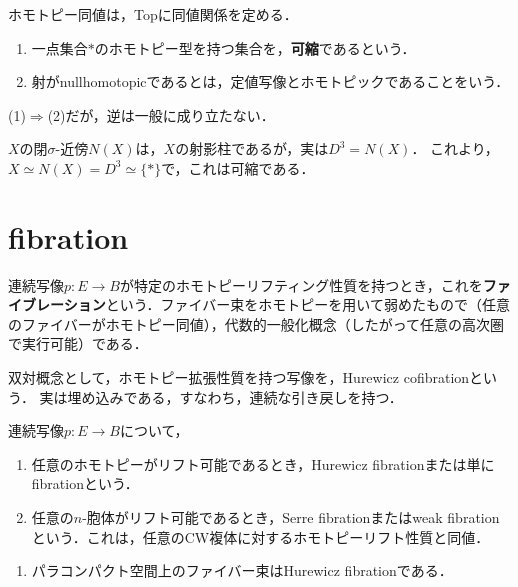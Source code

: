 \documentclass[uplatex,dvipdfmx]{jsreport}
\begin{document}
\begin{lemma}
    ホモトピー同値は，Topに同値関係を定める．
\end{lemma}

\begin{definition}\mbox{}
    \begin{enumerate}
        \item 一点集合$*$のホモトピー型を持つ集合を，\textbf{可縮}であるという．
        \item 射がnullhomotopicであるとは，定値写像とホモトピックであることをいう．
    \end{enumerate}
    (1)$\Rightarrow$(2)だが，逆は一般に成り立たない．
\end{definition}

\begin{example}
    $X$の閉$\sigma$-近傍$N(X)$は，$X$の射影柱であるが，実は$D^3= N(X)$．
    これより，$X\simeq N(X)=D^3\simeq\{*\}$で，これは可縮である．
\end{example}

\section{fibration}

\begin{tcolorbox}[colframe=ForestGreen, colback=ForestGreen!10!white,breakable,colbacktitle=ForestGreen!40!white,coltitle=black,fonttitle=\bfseries\sffamily,
title=]
    連続写像$p:E\to B$が特定のホモトピーリフティング性質を持つとき，これを\textbf{ファイブレーション}という．ファイバー束をホモトピーを用いて弱めたもので（任意のファイバーがホモトピー同値），代数的一般化概念（したがって任意の高次圏で実行可能）である．

    双対概念として，ホモトピー拡張性質を持つ写像を，Hurewicz cofibrationという．
    実は埋め込みである，すなわち，連続な引き戻しを持つ．
\end{tcolorbox}

\begin{definition}
    連続写像$p:E\to B$について，
    \begin{enumerate}
        \item 任意のホモトピーがリフト可能であるとき，Hurewicz fibrationまたは単にfibrationという．
        \item 任意の$n$-胞体がリフト可能であるとき，Serre fibrationまたはweak fibrationという．これは，任意のCW複体に対するホモトピーリフト性質と同値．
    \end{enumerate}
\end{definition}
\begin{example}\mbox{}
    \begin{enumerate}
        \item パラコンパクト空間上のファイバー束はHurewicz fibrationである．
    \end{enumerate}
\end{example}
\end{document}
